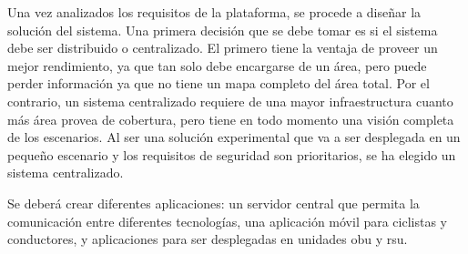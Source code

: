 Una vez analizados los requisitos de la plataforma, se procede a diseñar la solución del sistema. Una primera
decisión que se debe tomar es si el sistema debe ser distribuido o centralizado. El primero tiene la ventaja de
proveer un mejor rendimiento, ya que tan solo debe encargarse de un área, pero puede perder información
ya que no tiene un mapa completo del área total. Por el contrario, un sistema centralizado requiere de una 
mayor infraestructura cuanto más área provea de cobertura, pero tiene en todo momento una visión completa
de los escenarios. Al ser una solución experimental que va a ser desplegada en un pequeño escenario y los
requisitos de seguridad son prioritarios, se ha elegido un sistema centralizado.

Se deberá crear diferentes aplicaciones: un servidor central que permita la comunicación entre diferentes
tecnologías, una aplicación móvil para ciclistas y conductores, y aplicaciones para ser desplegadas en
unidades \gls{obu} y \gls{rsu}.





